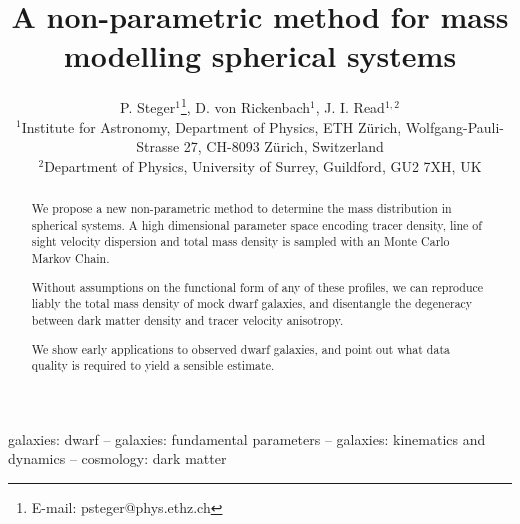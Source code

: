 \documentclass[useAMS,usenatbib]{mn2e}
\title[A non-parametric method for mass modelling spherical systems]{A non-parametric method for mass modelling spherical systems}
\author[Steger]{P. Steger$^1$\thanks{E-mail: psteger@phys.ethz.ch}, D. von Rickenbach$^1$, J. I. Read$^{1,2}$\\
$^1$Institute for Astronomy, Department of Physics, ETH Z\"urich, Wolfgang-Pauli-Strasse 27, CH-8093 Z\"urich, Switzerland\\
$^2$Department of Physics, University of Surrey, Guildford, GU2 7XH, UK
}
\newcommand{\TODO}[1]{\textsc{\textbf{\textcolor{red}{(TODO: #1)}}}}
\begin{document}
\maketitle

\begin{abstract}
We propose a new non-parametric method to determine the mass
distribution in spherical systems. A high dimensional parameter space
encoding tracer density, line of sight velocity dispersion and total
mass density is sampled with an Monte Carlo Markov Chain.

Without assumptions on the functional form of any of these profiles,
we can reproduce liably the total mass density of mock dwarf galaxies,
and disentangle the degeneracy between dark matter density and tracer
velocity anisotropy.

We show early applications to observed dwarf galaxies, and point out
what data quality is required to yield a sensible estimate.
\end{abstract}

\begin{keywords} galaxies: dwarf  -- galaxies: fundamental parameters  -- galaxies: kinematics and dynamics -- cosmology: dark matter
\end{keywords}













\end{document}
